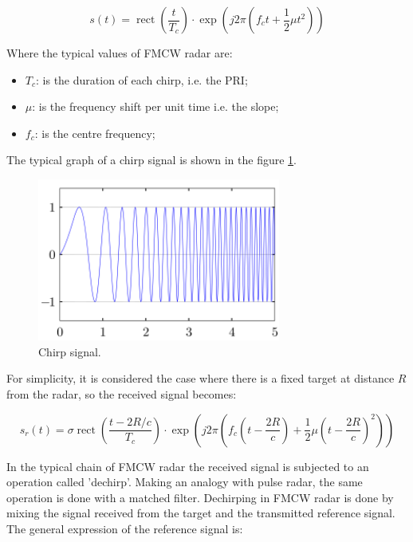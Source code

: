 \begin{equation}
s(t)=\operatorname{rect}\left(\frac{t}{T_{c}}\right) \cdot \exp \left(j 2 \pi\left(f_{c} t+\frac{1}{2} \mu t^{2}\right)\right)
\label{chirpsignal}
\end{equation}

Where the typical values of FMCW radar are:

\begin{itemize}
     \item \textbf{$T_c$}: is the duration of each chirp, i.e. the PRI;
         
    \item \textbf{$\mu$}: is the frequency shift per unit time i.e. the slope;
    
    \item \textbf{$f_c$}: is the centre frequency;
\end{itemize}

The typical graph of a chirp signal is shown in the figure \ref{chirpimg}.

\begin{figure}[h!]
    \centering
    \includegraphics[width=8cm]{Time-frequency analysis-chap3/img/chirpsig.png}
    \caption{Chirp signal.}
    \label{chirpimg}
\end{figure}

For simplicity, it is considered the case where there is a fixed target at distance $R$ from the radar, so the received signal becomes:

\begin{equation}
s_{r}(t)=\sigma \operatorname{rect}\left(\frac{t-2 R / c}{T_{c}}\right) \cdot \exp \left(j 2 \pi\left(f_{c}\left(t-\frac{2 R}{c}\right)+\frac{1}{2} \mu\left(t-\frac{2 R}{c}\right)^{2}\right)\right)
\end{equation}


In the typical chain of FMCW radar the received signal is subjected to an operation called 'dechirp'. Making an analogy with pulse radar, the same operation is done with a matched filter.
Dechirping in FMCW radar is done by mixing the signal received from the target and the transmitted reference signal. The general expression of the reference signal is:

